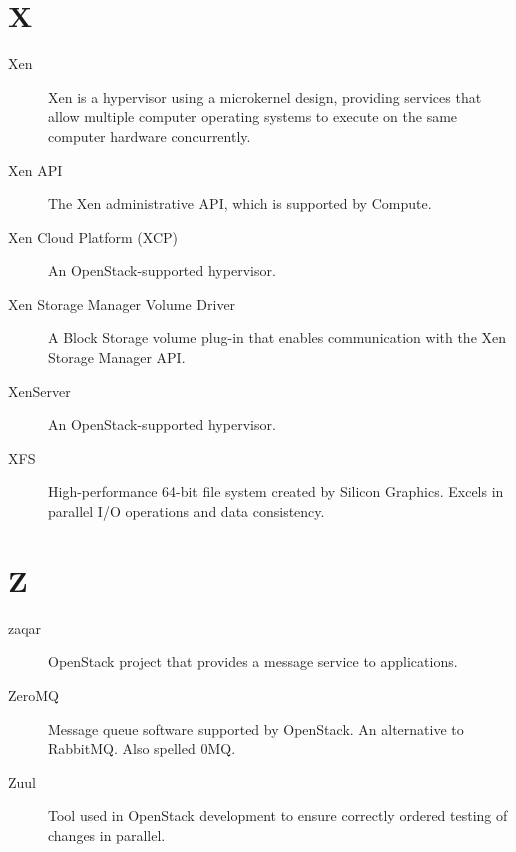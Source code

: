 \documentclass[letterpaper,10pt,english]{sphinxmanual}
\begin{document}
\section{X}
\label{_source/glossary:x}\begin{description}
\item[{Xen}] \leavevmode{}\label{_source/glossary:term-xen}
Xen is a hypervisor using a microkernel design, providing
services that allow multiple computer operating systems to
execute on the same computer hardware concurrently.

\item[{Xen API}] \leavevmode{}\label{_source/glossary:term-xen-api}
The Xen administrative API, which is supported by
Compute.

\item[{Xen Cloud Platform (XCP)}] \leavevmode{}\label{_source/glossary:term-xen-cloud-platform-xcp}
An OpenStack-supported hypervisor.

\item[{Xen Storage Manager Volume Driver}] \leavevmode{}\label{_source/glossary:term-xen-storage-manager-volume-driver}
A Block Storage volume plug-in that enables communication with
the Xen Storage Manager API.

\item[{XenServer}] \leavevmode{}\label{_source/glossary:term-xenserver}
An OpenStack-supported hypervisor.

\item[{XFS}] \leavevmode{}\label{_source/glossary:term-xfs}
High-performance 64-bit file system created by Silicon
Graphics. Excels in parallel I/O operations and data
consistency.

\end{description}


\section{Z}
\label{_source/glossary:z}\begin{description}
\item[{zaqar}] \leavevmode{}\label{_source/glossary:term-zaqar}
OpenStack project that provides a message service to
applications.

\item[{ZeroMQ}] \leavevmode{}\label{_source/glossary:term-zeromq}
Message queue software supported by OpenStack. An alternative to
RabbitMQ. Also spelled 0MQ.

\item[{Zuul}] \leavevmode{}\label{_source/glossary:term-zuul}
Tool used in OpenStack development to ensure correctly ordered
testing of changes in parallel.

\end{description}
\end{document}
